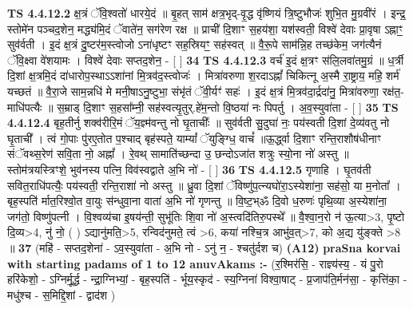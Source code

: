 \documentclass[17pt]{extarticle}
\begin{document}
                                \textbf{ TS 4.4.12.2} \newline
                  क्ष॒त्रं ॅवि॒श्वतो॑ धारये॒दं ॥ बृ॒हत् साम॑ क्षत्र॒भृद्-वृ॒द्ध वृ॑ष्णियं त्रि॒ष्टुभौजः॑ शुभि॒त मु॒ग्रवी॑रं । इन्द्र॒ स्तोमे॑न पञ्चद॒शेन॒ मद्ध्य॑मि॒दं ॅवाते॑न॒ सग॑रेण रक्ष ॥ प्राची॑ दि॒शाꣳ स॒हय॑शा॒ यश॑स्वती॒ विश्वे॑ देवाः प्रा॒वृषा ऽह्नाꣳ॒॒ सुव॑र्वती । इ॒दं क्ष॒त्रं दु॒ष्टर॑म॒स्त्वोजो ऽना॑धृष्टꣳ सह॒स्रियꣳ॒॒ सह॑स्वत् ॥ वै॒रू॒पे साम॑न्नि॒ह तच्छ॑केम॒ जग॑त्यैनं ॅवि॒क्ष्वा वे॑शयामः । विश्वे॑ देवाः सप्तद॒शेन॒ - [  ] \textbf{  34} \newline
                  \newline
                                \textbf{ TS 4.4.12.3} \newline
                  वर्च॑ इ॒दं क्ष॒त्रꣳ स॑लि॒लवा॑तमु॒ग्रं ॥ ध॒र्त्री दि॒शां क्ष॒त्रमि॒दं दा॑धारोप॒स्थाऽऽशा॑नां मि॒त्रव॑द॒स्त्वोजः॑ । मित्रा॑वरुणा श॒रदाऽह्नां᳚ चिकित्नू अ॒स्मै रा॒ष्ट्राय॒ महि॒ शर्म॑ यच्छतं ॥ वै॒रा॒जे साम॒न्नधि॑ मे मनी॒षाऽनु॒ष्टुभा॒ संभृ॑तं ॅवी॒र्यꣳ॑ सहः॑ । इ॒दं क्ष॒त्रं मि॒त्रव॑दा॒र्द्रदा॑नु॒ मित्रा॑वरुणा॒ रक्ष॑त॒-माधि॑पत्यैः ॥ स॒म्राड् दि॒शाꣳ स॒हसा᳚म्नी॒ सह॑स्वत्यृ॒तुर्.हे॑म॒न्तो वि॒ष्ठया॑ नः पिपर्तु । अ॒व॒स्युवा॑ता - [  ] \textbf{  35} \newline
                  \newline
                                \textbf{ TS 4.4.12.4} \newline
                  बृह॒तीर्नु शक्व॑रीरि॒मं ॅय॒ज्ञ्म॑वन्तु नो घृ॒ताचीः᳚ ॥ सुव॑र्वती सु॒दुघा॑ नः॒ पय॑स्वती दि॒शां दे॒व्य॑वतु नो घृ॒ताची᳚ । त्वं गो॒पाः पु॑रए॒तोत प॒श्चाद् बृह॑स्पते॒ याम्यां᳚ ॅयुङ्ग्धि॒ वाचं᳚ ॥ऊ॒र्द्ध्वा दि॒शाꣳ रन्ति॒राशौष॑धीनाꣳ संॅवथ्स॒रेण॑ सवि॒ता नो॒ अह्नां᳚ । रे॒वथ् सामाति॑च्छन्दा उ॒ छन्दोऽजा॑त शत्रुः स्यो॒ना नो॑ अस्तु ॥ स्तोम॑त्रयस्त्रिꣳशे॒ भुव॑नस्य पत्नि॒ विव॑स्वद्वाते अ॒भि नो॑ - [  ] \textbf{  36} \newline
                  \newline
                                \textbf{ TS 4.4.12.5} \newline
                  गृणाहि । घृ॒तव॑ती सवित॒राधि॑पत्यैः॒ पय॑स्वती॒ रन्ति॒राशा॑ नो अस्तु ॥ ध्रु॒वा दि॒शां ॅविष्णु॑प॒त्न्यघो॑रा॒ऽस्येशा॑ना॒ सह॑सो॒ या म॒नोता᳚ । बृह॒स्पति॑ र्मात॒रिश्वो॒त वा॒युः स॑न्धुवा॒ना वाता॑ अ॒भि नो॑ गृणन्तु ॥ वि॒ष्ट॒भ्ॐ दि॒वो ध॒रुणः॑ पृथि॒व्या अ॒स्येशा॑ना॒ जग॑तो॒ विष्णु॑पत्नी । वि॒श्वव्य॑चा इ॒षय॑न्ती॒ सुभू॑तिः शि॒वा नो॑ अ॒स्त्वदि॑तिरु॒पस्थे᳚ ॥ वै॒श्वा॒न॒रो न॑ ऊ॒त्या>3, पृ॒ष्टो दि॒व्य>4, नु॑ नो॒ ( ) ऽद्यानु॑मति॒>5, रन्विद॑नुमते॒ त्वं >6, कया॑ नश्चि॒त्र आभु॑व॒त्>7, को अ॒द्य यु॑ङ्क्ते >8 ॥ \textbf{  37} \newline
                  \newline
                      (महि॑ - सप्तद॒शेना॑ - ऽव॒स्युवा॑ता - अ॒भि नो - ऽनु॑ न॒ - श्चतु॑र्दश च)  \textbf{(A12)} \newline \newline
                \textbf{praSna korvai with starting padams of 1 to 12 anuvAkams :-} \newline
        (र॒श्मिर॑सि॒ - राज्ञ्य॑स्य॒ - यं पु॒रो हरि॑केशो॒ - ऽग्निर्मू॒र्द्ध - न्द्रा॒ग्निभ्यां॒ - बृह॒स्पति॑ - र्भूय॒स्कृद॑ - स्य॒ग्निना॑ विश्वा॒षाट् - प्र॒जाप॑ति॒र्मन॑सा॒ - कृत्ति॑का॒ - मधु॑श्च - स॒मिद्दि॒शां - द्वाद॑श ) \newline
\end{document}

